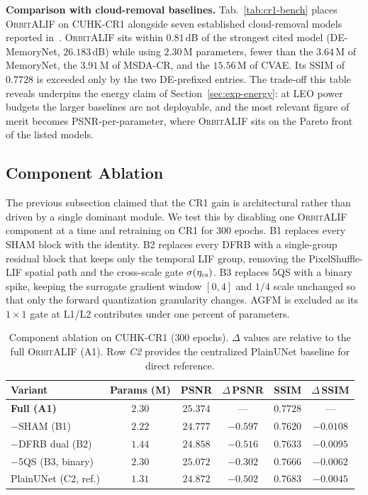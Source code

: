 \documentclass[conference]{IEEEtran}
\newcommand{\OrbitALIF}{\textsc{OrbitALIF}}
\newcommand{\FQS}{5QS}
\newcommand{\DFRB}{\textsc{DFRB}}
\newcommand{\SHAM}{\textsc{SHAM}}
\newcommand{\AGFM}{\textsc{AGFM}}
\begin{document}
\textbf{Comparison with cloud-removal baselines.}
Tab.~\ref{tab:cr1-bench} places \OrbitALIF{} on CUHK-CR1 alongside
seven established cloud-removal models reported
in~\cite{ref:cuhkcr}. \OrbitALIF{} sits within $0.81$\,dB of the
strongest cited model (DE-MemoryNet, $26.183$\,dB) while using
$2.30$\,M parameters, fewer than the $3.64$\,M of MemoryNet, the
$3.91$\,M of MSDA-CR, and the $15.56$\,M of CVAE. Its SSIM of
$0.7728$ is exceeded only by the two DE-prefixed entries. The
trade-off this table reveals underpins the energy claim of
Section~\ref{sec:exp-energy}: at LEO power budgets the larger
baselines are not deployable, and the most relevant figure of merit
becomes PSNR-per-parameter, where \OrbitALIF{} sits on the Pareto
front of the listed models.

\subsection{Component Ablation}\label{sec:exp-ablation}

The previous subsection claimed that the CR1 gain is architectural
rather than driven by a single dominant module. We test this by
disabling one \OrbitALIF{} component at a time and retraining on
CR1 for $300$ epochs. B1 replaces every \SHAM{} block with the
identity. B2 replaces every \DFRB{} with a single-group residual
block that keeps only the temporal LIF group, removing the
PixelShuffle-LIF spatial path and the cross-scale gate $\sigma(\eta_{\rm cs})$.
B3 replaces \FQS{} with a binary spike, keeping the surrogate
gradient window $[0,4]$ and $1/4$ scale unchanged so that only
the forward quantization granularity changes. \AGFM{} is excluded
as its $1\!\times\!1$ gate at L1/L2 contributes under one percent
of parameters.

\begin{table}[!htbp]
\centering
\caption{Component ablation on CUHK-CR1 ($300$ epochs).
$\Delta$ values are relative to the full \OrbitALIF{} (A1). Row
\emph{C2} provides the centralized PlainUNet baseline for direct
reference.}
\label{tab:ablation}
\begin{tabular}{lccccc}
\toprule
Variant & Params (M) & PSNR & $\Delta$\,PSNR & SSIM & $\Delta$\,SSIM \\
\midrule
\textbf{Full (A1)}        & $2.30$ & $\mathbf{25.374}$ & ---         & $\mathbf{0.7728}$ & ---           \\
$-$\SHAM{} (B1)           & $2.22$ & $24.777$         & $-0.597$    & $0.7620$         & $-0.0108$    \\
$-$\DFRB{} dual (B2)      & $1.44$ & $24.858$         & $-0.516$    & $0.7633$         & $-0.0095$    \\
$-$\FQS{} (B3, binary)    & $2.30$ & $25.072$         & $-0.302$    & $0.7666$         & $-0.0062$    \\
\midrule
PlainUNet (C2, ref.)      & $1.31$ & $24.872$         & $-0.502$    & $0.7683$         & $-0.0045$    \\
\bottomrule
\end{tabular}
\end{table}
\end{document}
